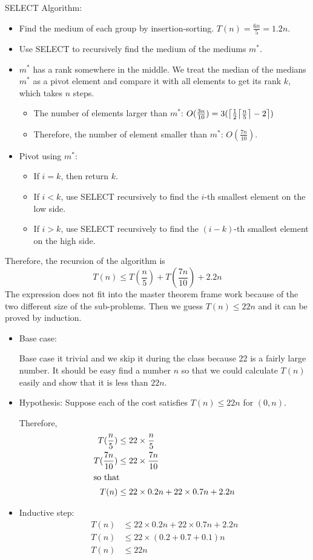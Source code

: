 \documentclass[en,hazy,blue,screen,14pt]{elegantnote}
\DeclarePairedDelimiter{\ceil}{\lceil}{\rceil}
\begin{document}
SELECT Algorithm:
\begin{itemize}
\item Find the medium of each group by insertion-sorting. $T(n) = \frac{6n}{5} 
= 1.2n$.
\item Use SELECT to recursively find the medium of the mediums $m^*$.
\item $m^*$ has a rank somewhere in the middle.
We treat the median of the medians $m^*$ as a pivot element and compare it with all elements to get its rank $k$, which takes $n$ steps.
    \begin{itemize}
        \item The number of elements larger than $m^*$: $O(\frac{3n}{10}) 
    =3(\ceil*{\frac{1}{2}\ceil*{\frac{n}{5}} - 2})$
        \item Therefore, the number of element smaller than $m^*$: 
    $O(\frac{7n}{10})$.
    \end{itemize}
\item Pivot using $m^*$:
    \begin{itemize}
     \item If $i = k$, then return $k$.
     \item If $i < k$, use SELECT recursively to find the $i$-th smallest 
element on the low side.
     \item If $i > k$, use SELECT recursively to find the $(i-k)$-th smallest 
element on the high side.
    \end{itemize}
\end{itemize}
Therefore, the recursion of the algorithm is
\[T(n) \le T(\frac{n}{5}) + T(\frac{7n}{10}) + 2.2n\]
The expression does not fit into the master theorem frame work because of the 
two different size of the sub-problems. Then we guess $T(n) \le 22n$ and it can 
be proved by induction.
\begin{itemize}
\item Base case:

    Base case it trivial and we skip it during the class because 22 is a 
fairly large number. It should be easy find a number $n$ so that we could 
calculate $T(n)$ easily and show that it is less than $22n$.

\item Hypothesis: Suppose each of the cost satisfies $T(n) \le 22n$ for $(0, 
n)$. 

Therefore, 
    \begin{align*}
    T(\frac{n}{5}) &\le 22 \times \frac{n}{5}\\
    T(\frac{7n}{10}) &\le 22 \times \frac{7n}{10}\\
    \intertext{so that}
    T(n) &\le 22 \times 0.2 n + 22 \times 0.7 n + 2.2n
    \end{align*}
\item Inductive step:
    \begin{align*}
    T(n) &\le 22 \times 0.2 n + 22 \times 0.7 n + 2.2n\\
    T(n) &\le 22 \times (0.2 + 0.7 + 0.1)n\\
    T(n) &\le 22n
    \end{align*}

\end{itemize}
\end{document}
